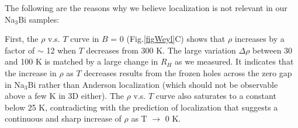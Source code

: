 


The following are the reasons why we believe localization is not relevant in our Na$_3$Bi samples:

First, the $\rho$ v.s. $T$ curve in $B$ = 0 (Fig.\ref{figWeyl}C) shows that $\rho$ increases by a factor of $\sim$ 12 when $T$ decreases from 300 K. The large variation $\Delta \rho$ between 30 and 100 K is matched by a large change in $R_H$ as we measured. It indicates that the increase in $\rho$ as $T$ decreases results from the frozen holes across the zero gap in Na$_3$Bi rather than Anderson localization (which should not be observable above a few K in 3D either). The $\rho$ v.s. $T$ curve also saturates to a constant below 25 K, contradicting with the prediction of localization that suggests a continuous and sharp increase of $\rho$ as T $\to$ 0 K. 

